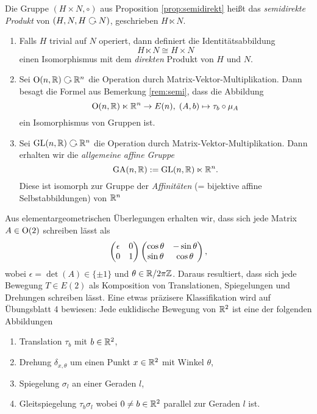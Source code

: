 \documentclass{book}
\begin{document}
\begin{defi}
    \label{defi:semidirekt}
    Die Gruppe $(H \times N, \circ)$ aus Proposition \ref{prop:semidirekt}
    heißt das \emph{semidirekte Produkt} von $(H,N, H \actson N)$, geschrieben
    $H \ltimes N$. 
\end{defi}

\begin{exas}
    \label{exas:semidirekt}
    \begin{enumerate}
        \item Falls $H$ trivial auf $N$ operiert, dann definiert die Identitätsabbildung
            \[
                H \ltimes N \cong H \times N
            \]
            einen Isomorphismus mit dem \emph{direkten} Produkt von $H$ und $N$.
        \item Sei $\O(n,\RR) \actson \RR^n$ die Operation durch
            Matrix-Vektor-Multiplikation. Dann besagt die Formel aus Bemerkung
            \ref{rem:semi}, dass die Abbildung
            \[
                \operatorname{O}(n,\mathbb{R}) \ltimes \mathbb{R}^n \to E(n),\; (A,b) \mapsto \tau_{b} \circ \mu_A
            \]
            ein Isomorphismus von Gruppen ist.
        \item Sei $\GL(n,\RR) \actson \RR^n$ die Operation durch
            Matrix-Vektor-Multiplikation. Dann erhalten wir die {\em allgemeine affine Gruppe}
            \[
                \operatorname{GA}(n,\mathbb{R}) := \operatorname{GL}(n,\mathbb{R}) \ltimes \mathbb{R}^n. 
            \]
            Diese ist isomorph zur Gruppe der {\em Affinitäten} (= bijektive
            affine Selbstabbildungen) von $\mathbb{R}^n$
    \end{enumerate}
\end{exas}

\begin{exa}
    \label{exa:e2}
    Aus elementargeometrischen Überlegungen erhalten wir, dass sich jede Matrix $A \in \operatorname{O}(2)$ schreiben lässt als
    \[
        \begin{pmatrix}  \epsilon & 0 \\ 0 & 1 \end{pmatrix} \begin{pmatrix}  \cos \theta & - \sin \theta\\ \sin \theta & \cos \theta  \end{pmatrix},
    \]
    wobei $\epsilon = \det(A) \in \{\pm 1\}$ und $\theta \in \mathbb{R}/2\pi \mathbb{Z}$.
    Daraus resultiert, dass sich jede Bewegung $T \in E(2)$ als Komposition von
    Translationen, Spiegelungen und Drehungen schreiben lässt. Eine etwas
    präzisere Klassifikation wird auf Übungsblatt 4 bewiesen: Jede euklidische
    Bewegung von $\mathbb{R}^2$ ist eine der folgenden Abbildungen
	\begin{enumerate}
		\item Translation $\tau_b$ mit $b \in \mathbb{R}^2$, 
		\item Drehung $\delta_{x,\theta}$ um einen Punkt $x \in \mathbb{R}^2$ mit Winkel
			$\theta$,
		\item Spiegelung $\sigma_l$ an einer Geraden $l$,
		\item Gleitspiegelung $\tau_b\sigma_l$ wobei $0 \ne b \in \mathbb{R}^2$ parallel zur Geraden $l$
			ist.
	\end{enumerate}
\end{exa}
\end{document}
